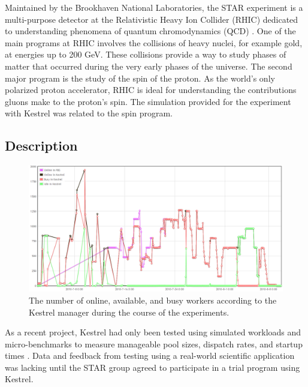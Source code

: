 \label{sec:STAR} Maintained by the Brookhaven National Laboratories,
the STAR experiment is a multi-purpose detector at the Relativistic
Heavy Ion Collider (RHIC) dedicated to understanding phenomena of
quantum chromodynamics (QCD) \cite{STAR}. One of the main programs
at RHIC involves the collisions of heavy nuclei, for example gold,
at energies up to 200 GeV. These collisions provide a way to study
phases of matter that occurred during the very early phases of the
universe. The second major program is the study of the spin of the
proton. As the world's only polarized proton accelerator, RHIC is
ideal for understanding the contributions gluons make to the proton's
spin. The simulation provided for the experiment with Kestrel was
related to the spin program.


\subsection{Description}

%
\begin{figure}
\includegraphics[width=\columnwidth]{figures/kestrel_stats}
\caption{\label{fig:Kestrel-Stats} The number of online, available, and busy
workers according to the Kestrel manager during the course of the
experiments. }
\end{figure}


As a recent project, Kestrel had only been tested using simulated
workloads and micro-benchmarks to measure manageable pool sizes, dispatch
rates, and startup times \cite{Stout10}. Data and feedback from testing
using a real-world scientific application was lacking until the STAR
group agreed to participate in a trial program using Kestrel.

